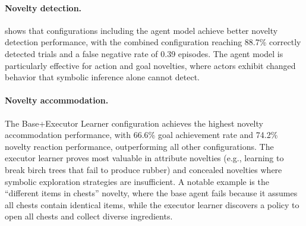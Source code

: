 \paragraph{Novelty detection.}  shows that configurations including the agent model achieve better novelty detection performance, with the combined configuration reaching 88.7\% correctly detected trials and a false negative rate of 0.39 episodes. The agent model is particularly effective for action and goal novelties, where actors exhibit changed behavior that symbolic inference alone cannot detect.  

\paragraph{Novelty accommodation.}  The Base+Executor Learner configuration achieves the highest novelty accommodation performance, with 66.6\% goal achievement rate and 74.2\% novelty reaction performance, outperforming all other configurations.  The executor learner proves most valuable in attribute novelties (e.g., learning to break birch trees that fail to produce rubber) and concealed novelties where symbolic exploration strategies are insufficient. A notable example is the ``different items in chests'' novelty, where the base agent fails because it assumes all chests contain identical items, while the executor learner discovers a policy to open all chests and collect diverse ingredients.

\rev{}
\rev{}
\rev{}
\rev{}


